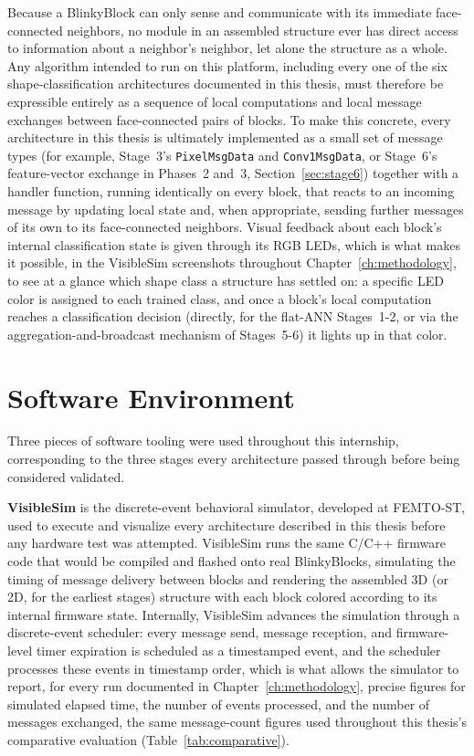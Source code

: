 \documentclass[12pt,a4paper]{report}
\begin{document}
Because a BlinkyBlock can only sense and communicate with its immediate face-connected neighbors, no module in an assembled structure ever has direct access to information about a neighbor's neighbor, let alone the structure as a whole. Any algorithm intended to run on this platform, including every one of the six shape-classification architectures documented in this thesis, must therefore be expressible entirely as a sequence of local computations and local message exchanges between face-connected pairs of blocks. To make this concrete, every architecture in this thesis is ultimately implemented as a small set of message types (for example, Stage~3's \texttt{PixelMsgData} and \texttt{Conv1MsgData}, or Stage~6's feature-vector exchange in Phases~2 and~3, Section~\ref{sec:stage6}) together with a handler function, running identically on every block, that reacts to an incoming message by updating local state and, when appropriate, sending further messages of its own to its face-connected neighbors. Visual feedback about each block's internal classification state is given through its RGB LEDs, which is what makes it possible, in the VisibleSim screenshots throughout Chapter~\ref{ch:methodology}, to see at a glance which shape class a structure has settled on: a specific LED color is assigned to each trained class, and once a block's local computation reaches a classification decision (directly, for the flat-ANN Stages~1-2, or via the aggregation-and-broadcast mechanism of Stages~5-6) it lights up in that color.

\section{Software Environment}

Three pieces of software tooling were used throughout this internship, corresponding to the three stages every architecture passed through before being considered validated.

\textbf{VisibleSim} is the discrete-event behavioral simulator, developed at FEMTO-ST, used to execute and visualize every architecture described in this thesis before any hardware test was attempted. VisibleSim runs the same C/C++ firmware code that would be compiled and flashed onto real BlinkyBlocks, simulating the timing of message delivery between blocks and rendering the assembled 3D (or 2D, for the earliest stages) structure with each block colored according to its internal firmware state. Internally, VisibleSim advances the simulation through a discrete-event scheduler: every message send, message reception, and firmware-level timer expiration is scheduled as a timestamped event, and the scheduler processes these events in timestamp order, which is what allows the simulator to report, for every run documented in Chapter~\ref{ch:methodology}, precise figures for simulated elapsed time, the number of events processed, and the number of messages exchanged, the same message-count figures used throughout this thesis's comparative evaluation (Table~\ref{tab:comparative}).
\end{document}
